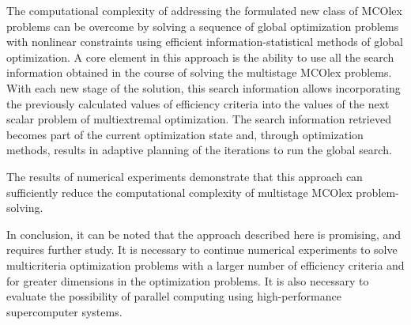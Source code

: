 \documentclass[smallextended]{svjour3}       %
\begin{document}
The computational complexity of addressing the formulated new class of MCOlex problems can be overcome by solving a sequence of global optimization problems with nonlinear constraints using efficient information-statistical methods of global optimization. A core element in this approach is the ability to use all the search information obtained in the course of solving the multistage MCOlex problems. With each new stage of the solution, this search information allows incorporating the previously calculated values of efficiency criteria into the values of the next scalar problem of multiextremal optimization. The search information retrieved becomes part of the current optimization state and, through optimization methods, results in adaptive planning of the iterations to run the global search. 

The results of numerical experiments demonstrate that this approach can sufficiently reduce the computational complexity of multistage MCOlex problem-solving.

In conclusion, it can be noted that the approach described here is promising, and requires further study. It is necessary to continue numerical experiments to solve multicriteria optimization problems with a larger number of efficiency criteria and for greater dimensions in the optimization problems. It is also necessary to evaluate the possibility of parallel computing using high-performance supercomputer systems.
\end{document}
